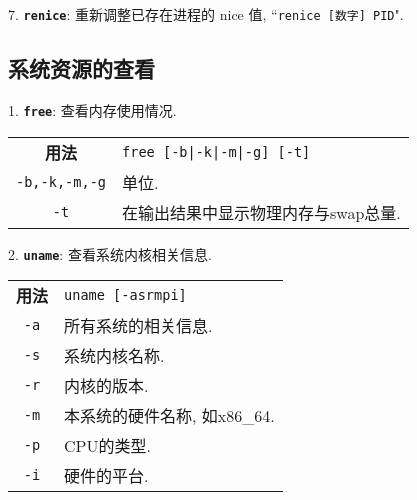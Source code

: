 \par
7. \textbf{\texttt{renice}}: 重新调整已存在进程的 nice 值, ``\verb"renice [数字] PID"".


\subsection{系统资源的查看}
\par
1. \textbf{\texttt{free}}: 查看内存使用情况.
\begin{longtable}{c@{ : }p{}}\hline\hline

    \textbf{用法} & \verb"free [-b|-k|-m|-g] [-t]"\\

    \texttt{-b,-k,-m,-g} & 单位. \\

    \texttt{-t} & 在输出结果中显示物理内存与swap总量.\\

    \hline
\end{longtable}

\par
2. \textbf{\texttt{uname}}: 查看系统内核相关信息.
\begin{longtable}{c@{ : }p{}}\hline\hline

    \textbf{用法} & \verb"uname [-asrmpi]"\\

    \texttt{-a} & 所有系统的相关信息. \\

    \texttt{-s} & 系统内核名称.\\
    
    \texttt{-r} & 内核的版本. \\
    
    \texttt{-m} & 本系统的硬件名称, 如x86\_64. \\
    
    \texttt{-p} & CPU的类型. \\
    
    \texttt{-i} & 硬件的平台. \\

    \hline
\end{longtable}

